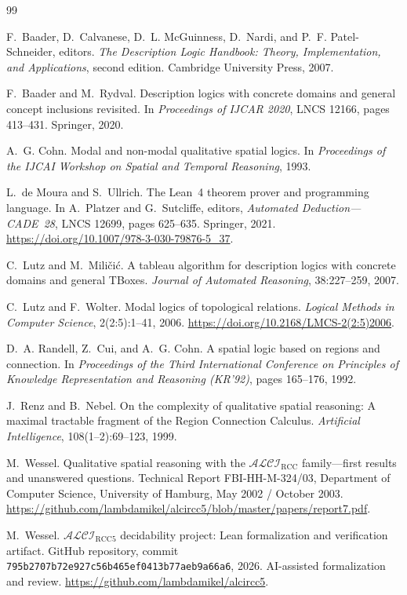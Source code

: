 \documentclass[11pt]{article}
\theoremstyle{plain}
\theoremstyle{definition}
\theoremstyle{remark}
\newcommand{\Logic}{\ensuremath{\mathcal{ALCI}_{\mathrm{RCC5}}}}
\newcommand{\code}[1]{\texttt{#1}}
\begin{document}
\begin{thebibliography}{99}

F.~Baader, D.~Calvanese, D.~L. McGuinness, D.~Nardi, and P.~F.
Patel-Schneider, editors.
\newblock \emph{The Description Logic Handbook: Theory, Implementation, and
Applications}, second edition.
\newblock Cambridge University Press, 2007.

F.~Baader and M.~Rydval.
\newblock Description logics with concrete domains and general concept
inclusions revisited.
\newblock In \emph{Proceedings of IJCAR 2020}, LNCS 12166, pages 413--431.
Springer, 2020.

A.~G. Cohn.
\newblock Modal and non-modal qualitative spatial logics.
\newblock In \emph{Proceedings of the IJCAI Workshop on Spatial and Temporal
Reasoning}, 1993.

L.~de Moura and S.~Ullrich.
\newblock The Lean~4 theorem prover and programming language.
\newblock In A.~Platzer and G.~Sutcliffe, editors, \emph{Automated Deduction---CADE~28},
LNCS 12699, pages 625--635. Springer, 2021.
\newblock \url{https://doi.org/10.1007/978-3-030-79876-5_37}.

C.~Lutz and M.~Mili\v{c}i\'c.
\newblock A tableau algorithm for description logics with concrete domains and
general TBoxes.
\newblock \emph{Journal of Automated Reasoning}, 38:227--259, 2007.

C.~Lutz and F.~Wolter.
\newblock Modal logics of topological relations.
\newblock \emph{Logical Methods in Computer Science}, 2(2:5):1--41, 2006.
\newblock \url{https://doi.org/10.2168/LMCS-2(2:5)2006}.

D.~A. Randell, Z.~Cui, and A.~G. Cohn.
\newblock A spatial logic based on regions and connection.
\newblock In \emph{Proceedings of the Third International Conference on
Principles of Knowledge Representation and Reasoning (KR'92)}, pages 165--176,
1992.

J.~Renz and B.~Nebel.
\newblock On the complexity of qualitative spatial reasoning: A maximal
tractable fragment of the Region Connection Calculus.
\newblock \emph{Artificial Intelligence}, 108(1--2):69--123, 1999.

M.~Wessel.
\newblock Qualitative spatial reasoning with the $\mathcal{ALCI}_{\mathrm{RCC}}$
family---first results and unanswered questions.
\newblock Technical Report FBI-HH-M-324/03, Department of Computer Science,
University of Hamburg, May 2002 / October 2003.
\newblock \url{https://github.com/lambdamikel/alcircc5/blob/master/papers/report7.pdf}.

M.~Wessel.
\newblock $\Logic$ decidability project: Lean formalization and verification
artifact.
\newblock GitHub repository, commit
\code{795b2707b72e927c56b465ef0413b77aeb9a66a6}, 2026.
\newblock AI-assisted formalization and review.
\newblock \url{https://github.com/lambdamikel/alcircc5}.

\end{thebibliography}
\end{document}
